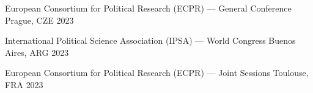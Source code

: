 






\vspace{1mm}

\begin{cvhonors}
\cvconf
{European Consortium for Political Research (ECPR) --- General Conference} 
{Prague, CZE}
{2023}
\end{cvhonors}

\begin{cvhonors}
\cvconf
{International Political Science Association (IPSA) --- World Congress} 
{Buenos Aires, ARG}
{2023}
\end{cvhonors}



\begin{cvhonors}
\cvconf
{European Consortium for Political Research (ECPR) --- Joint Sessions} 
{Toulouse, FRA}
{2023}
\end{cvhonors}

